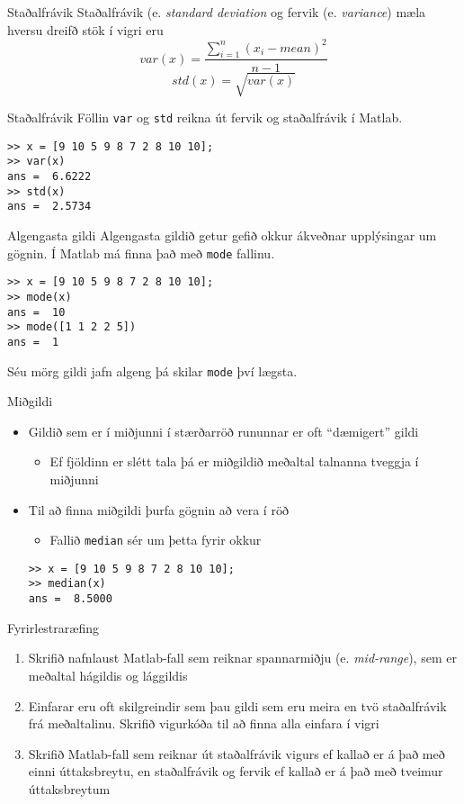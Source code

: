 \documentclass{beamer}
\begin{document}
\begin{frame}{Staðalfrávik}
Staðalfrávik (e. \emph{standard deviation} og fervik (e. \emph{variance}) mæla hversu dreifð stök í vigri eru
\[
 var(x) = \frac{\sum_{i=1}^n (x_i - mean)^2}{n-1}
\]
\[
  std(x) = \sqrt{var(x)}
\]
\end{frame}

\begin{frame}[fragile]{Staðalfrávik}
Föllin \texttt{var} og \texttt{std} reikna út fervik og staðalfrávik í Matlab.
\begin{verbatim}
>> x = [9 10 5 9 8 7 2 8 10 10];
>> var(x)
ans =  6.6222
>> std(x)
ans =  2.5734
\end{verbatim}
\end{frame}

\begin{frame}[fragile]{Algengasta gildi}
Algengasta gildið getur gefið okkur ákveðnar upplýsingar um gögnin. Í Matlab má finna það með \texttt{mode} fallinu.
\begin{verbatim}
>> x = [9 10 5 9 8 7 2 8 10 10];
>> mode(x)
ans =  10
>> mode([1 1 2 2 5])
ans =  1
\end{verbatim}
Séu mörg gildi jafn algeng þá skilar \texttt{mode} því lægsta.
\end{frame}

\begin{frame}[fragile]{Miðgildi}
\begin{itemize}
 \item Gildið sem er í miðjunni í stærðarröð rununnar er oft ``dæmigert'' gildi
 \begin{itemize}
  \item Ef fjöldinn er slétt tala þá er miðgildið meðaltal talnanna tveggja í miðjunni
 \end{itemize}
 \item Til að finna miðgildi þurfa gögnin að vera í röð
 \begin{itemize}
  \item Fallið \texttt{median} sér um þetta fyrir okkur
 \end{itemize}
\begin{verbatim}
>> x = [9 10 5 9 8 7 2 8 10 10];
>> median(x)
ans =  8.5000
\end{verbatim}
\end{itemize}
\end{frame}

\begin{frame}{Fyrirlestraræfing}
\begin{enumerate}
 \setcounter{enumi}{0}
 \item Skrifið nafnlaust Matlab-fall sem reiknar spannarmiðju (e. \emph{mid-range}), sem er meðaltal hágildis og lággildis
 \item Einfarar eru oft skilgreindir sem þau gildi sem eru meira en tvö staðalfrávik frá meðaltalinu. Skrifið vigurkóða til að finna alla einfara í vigri
 \item Skrifið Matlab-fall sem reiknar út staðalfrávik vigurs ef kallað er á það með einni úttaksbreytu, en staðalfrávik og fervik ef kallað er á það með tveimur úttaksbreytum
\end{enumerate}
\end{frame}
\end{document}
